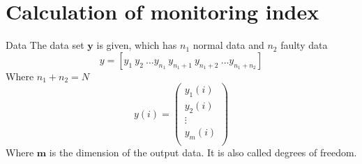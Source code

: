 \documentclass[10pt]{beamer}
\begin{document}
\section{Calculation of monitoring index}
\begin{frame}{Data}
The data set $\textbf{y}$ is given, which has $n_1$ normal data and $n_2$
faulty data
\begin{equation}
   y = [y_1 \ y_2 \ \dots y_{n_1} \ y_{n_1+1} \ y_{n_1+2} \ \dots y_{n_1+n_2}] 
\end{equation}
Where $n_1 + n_2 = N$
\begin{equation}
    y(i) = 
    \begin{pmatrix}
        y_1(i) \\
        y_2(i) \\
       \vdots  \\
        y_m(i) \\ 
    \end{pmatrix}
\end{equation}
Where $\textbf{m}$ is the dimension of the output data. It is also called  degrees of freedom. %
\end{frame}
\end{document}
